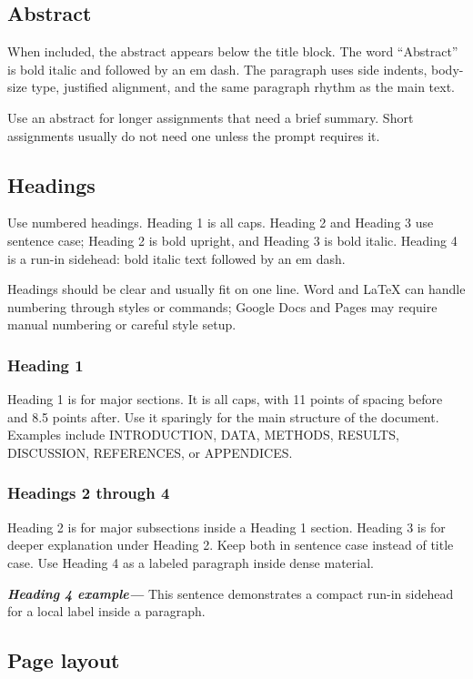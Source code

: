\documentclass[11pt,letterpaper]{article}
\newcommand{\rdtrunin}[1]{\textbf{\textit{#1---}}}
\begin{document}
\subsection{Abstract}

When included, the abstract appears below the title block. The word
``Abstract'' is bold italic and followed by an em dash. The paragraph
uses side indents, body-size type, justified alignment, and the same
paragraph rhythm as the main text.

Use an abstract for longer assignments that need a brief summary. Short
assignments usually do not need one unless the prompt requires it.

\subsection{Headings}

Use numbered headings. Heading 1 is all caps. Heading 2 and Heading 3
use sentence case; Heading 2 is bold upright, and Heading 3 is bold
italic. Heading 4 is a run-in sidehead: bold italic text followed by an
em dash.

Headings should be clear and usually fit on one line. Word and LaTeX can
handle numbering through styles or commands; Google Docs and Pages may
require manual numbering or careful style setup.

\subsubsection{Heading 1}

Heading 1 is for major sections. It is all caps, with 11 points of
spacing before and 8.5 points after. Use it sparingly for the main
structure of the document. Examples include INTRODUCTION, DATA,
METHODS, RESULTS, DISCUSSION, REFERENCES, or APPENDICES.

\subsubsection{Headings 2 through 4}

Heading 2 is for major subsections inside a Heading 1 section. Heading
3 is for deeper explanation under Heading 2. Keep both in sentence case
instead of title case. Use Heading 4 as a labeled paragraph inside dense
material.

\rdtrunin{Heading 4 example} This sentence demonstrates a compact run-in
sidehead for a local label inside a paragraph.

\subsection{Page layout}
\end{document}
